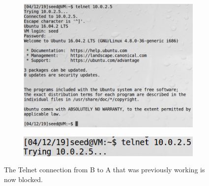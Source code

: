 \documentclass[12pt,letterpaper]{article}
\begin{document}
		\begin{figure}[p]
			\centering
			\begin{subfigure}{.5\linewidth}
				\centering
				\includegraphics[width=.95\linewidth]{task-1-b-a-telnet-working}
			\end{subfigure}%
			\begin{subfigure}{.5\linewidth}
				\centering
				\includegraphics[width=.95\linewidth]{task-1-b-a-telnet-blocked}
			\end{subfigure}
			\caption{The Telnet connection from B to A that was previously working is now blocked.}
			\label{fig:task-1-telnet-b-a}
		\end{figure}
	
\end{document}
